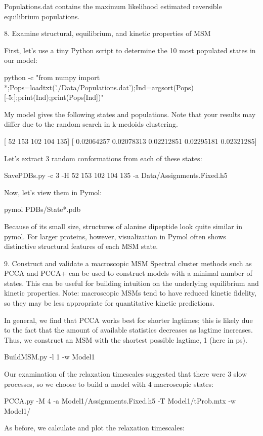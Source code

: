 \documentclass[12pt]{article}
\begin{document}
Populations.dat contains the maximum likelihood estimated reversible equilibrium populations.  

8.  Examine structural, equilibrium, and kinetic properties of MSM

First, let’s use a tiny Python script to determine the 10 most populated states in our model:

python -c "from numpy import *;Pops=loadtxt('./Data/Populations.dat');Ind=argsort(Pops)[-5:];print(Ind);print(Pops[Ind])"

My model gives the following states and populations.  Note that your results may differ due to the random search in k-medoids clustering. 

[ 52 153 102 104 135]
[ 0.02064257  0.02078313  0.02212851  0.02295181  0.02321285]

Let’s extract 3 random conformations from each of these states:

SavePDBs.py -c 3 -H  52 153 102 104 135 -a Data/Assignments.Fixed.h5

Now, let’s view them in Pymol:

pymol PDBs/State*.pdb

Because of its small size, structures of alanine dipeptide look quite similar in pymol.  For larger proteins, however, visualization in Pymol often shows distinctive structural features of each MSM state.  

9.  Construct and validate a macroscopic MSM
Spectral cluster methods such as PCCA and PCCA+ can be used to construct models with a minimal number of states.  This can be useful for building intuition on the underlying equilibrium and kinetic properties.  
Note: macroscopic MSMs tend to have reduced kinetic fidelity, so they may be less appropriate for quantitative kinetic predictions.  

In general, we find that PCCA works best for shorter lagtimes; this is likely due to the fact that the amount of available statistics decreases as lagtime increases.  Thus, we construct an MSM with the shortest possible lagtime, 1 (here in ps).

BuildMSM.py -l 1 -w Model1

Our examination of the relaxation timescales suggested that there were 3 slow processes, so we choose to build a model with 4 macroscopic states:

PCCA.py -M 4 -a Model1/Assignments.Fixed.h5 -T Model1/tProb.mtx -w Model1/

As before, we calculate and plot the relaxation timescales:
\end{document}

